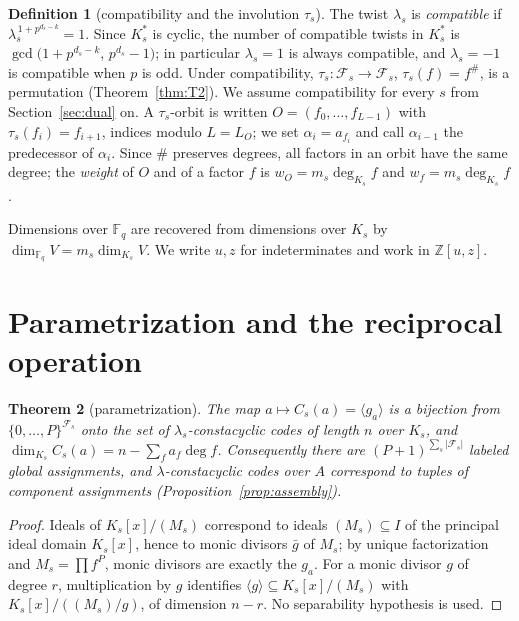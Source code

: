 \documentclass[10pt,journal,draftclsnofoot,onecolumn]{IEEEtran}
\newtheorem{theorem}{Theorem}[section]
\theoremstyle{definition}
\newtheorem{definition}[theorem]{Definition}
\theoremstyle{remark}
\newcommand{\Fq}{\mathbb{F}_q}
\newcommand{\Z}{\mathbb{Z}}
\begin{document}
\begin{definition}[compatibility and the involution \(\tau_s\)]
The twist \(\lambda_s\) is \emph{compatible} if
\(\lambda_s^{\,1 + p^{d_s - k}} = 1\). Since \(K_s^*\) is cyclic, the
number of compatible twists in \(K_s^*\) is
\(\gcd\big(1 + p^{d_s-k},\, p^{d_s} - 1\big)\); in particular
\(\lambda_s = 1\) is always compatible, and \(\lambda_s = -1\) is
compatible when \(p\) is odd.
Under compatibility, \(\tau_s : \mathcal{F}_s \to \mathcal{F}_s\),
\(\tau_s(f) = f^{\#}\), is a permutation (Theorem~\ref{thm:T2}). We
assume compatibility for every \(s\) from Section~\ref{sec:dual} on.
A \(\tau_s\)-orbit is written \(O = (f_0, \dots, f_{L-1})\) with
\(\tau_s(f_i) = f_{i+1}\), indices modulo \(L = L_O\); we set
\(\alpha_i = a_{f_i}\) and call \(\alpha_{i-1}\) the predecessor of
\(\alpha_i\). Since \(\#\) preserves degrees, all factors in an orbit
have the same degree; the \emph{weight} of \(O\) and of a factor \(f\) is
\(w_O = m_s \deg_{K_s} f\) and \(w_f = m_s \deg_{K_s} f\).
\end{definition}

Dimensions over \(\Fq\) are recovered from dimensions over \(K_s\) by
\(\dim_{\Fq} V = m_s \dim_{K_s} V\). We write \(u, z\) for indeterminates
and work in \(\Z[u,z]\).

\section{Parametrization and the reciprocal operation}\label{sec:param}

\begin{theorem}[parametrization]\label{thm:T1}
The map \(a \mapsto C_s(a) = \langle g_a \rangle\) is a bijection from
\(\{0,\dots,P\}^{\mathcal{F}_s}\) onto the set of \(\lambda_s\)-constacyclic
codes of length \(n\) over \(K_s\), and
\(\dim_{K_s} C_s(a) = n - \sum_{f} a_f \deg f\).
Consequently there are \((P+1)^{\sum_s |\mathcal{F}_s|}\) labeled global
assignments, and \(\lambda\)-constacyclic codes over \(A\) correspond to tuples
of component assignments (Proposition~\ref{prop:assembly}).
\end{theorem}

\begin{proof}
Ideals of \(K_s[x]/(M_s)\) correspond to ideals \((M_s) \subseteq I\) of
the principal ideal domain \(K_s[x]\), hence to monic divisors
\(\bar g\) of \(M_s\); by unique factorization and \(M_s =
\prod f^P\), monic divisors are exactly the \(g_a\). For a monic divisor
\(g\) of degree \(r\), multiplication by \(g\) identifies
\(\langle g \rangle \subseteq K_s[x]/(M_s)\) with
\(K_s[x]/((M_s)/g)\), of dimension \(n - r\). No separability hypothesis
is used.
\end{proof}
\end{document}
